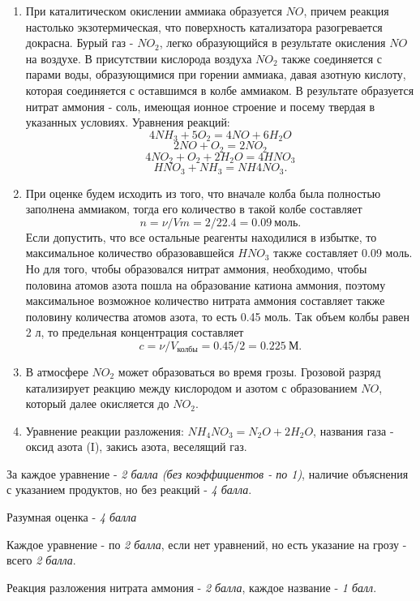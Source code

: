 \solutionSection

\begin{enumerate}
    \item При каталитическом окислении аммиака образуется $NO$, причем реакция настолько экзотермическая, 
    что поверхность катализатора разогревается докрасна. Бурый газ - $NO_2$, легко образующийся в 
    результате окисления $NO$ на воздухе. В присутствии кислорода воздуха $NO_2$ также соединяется с парами воды, 
    образующимися при горении аммиака, давая азотную кислоту, которая соединяется с оставшимся в колбе аммиаком. 
    В результате образуется нитрат аммония - соль, имеющая ионное строение и посему твердая в указанных условиях.
    Уравнения реакций:
    $$4NH_3 + 5O_2 = 4NO + 6H_2O$$
    $$2NO + O_2 = 2NO_2$$
    $$4NO_2 + O_2 + 2H_2O = 4HNO_3$$
    $$HNO_3 + NH_3 = NH4NO_3.$$
    \item При оценке будем исходить из того, что вначале колба была полностью заполнена аммиаком, тогда его количество в такой 
    колбе составляет $$n = \nu/Vm = 2/22.4 = 0.09 \: \text{моль}.$$ Если допустить, что все остальные реагенты находилися в 
    избытке, то максимальное количество образовавшейся $HNO_3$ также составляет 0.09 моль. Но для того, чтобы 
    образовался нитрат аммония, необходимо, чтобы половина атомов азота пошла на образование катиона аммония, 
    поэтому максимальное возможное количество нитрата аммония составляет также половину количества атомов азота, 
    то есть 0.45 моль. Так объем колбы равен 2 л, то предельная концентрация составляет $$c = \nu/V_{\text{колбы}}=0.45/2 = 0.225 \: \text{М}.$$
    \item В атмосфере $NO_2$ может образоваться во время грозы. Грозовой разряд катализирует реакцию между кислородом и азотом с образованием $NO$, 
    который далее окисляется до $NO_2$.
    \item Уравнение реакции разложения:  $NH_4NO_3 = N_2O + 2H_2O$, названия газа - оксид азота (I), закись азота, 
    веселящий газ.
\end{enumerate}

\additionalCriteria

За каждое уравнение - \textit{2 балла (без коэффициентов - по 1)}, наличие объяснения с указанием продуктов, но без реакций - \textit{4 балла}.

Разумная оценка - \textit{4 балла}

Каждое уравнение - по \textit{2 балла}, если нет уравнений, но есть указание на грозу - всего \textit{2 балла}.

Реакция разложения нитрата аммония - \textit{2 балла}, каждое название - \textit{1 балл}.
